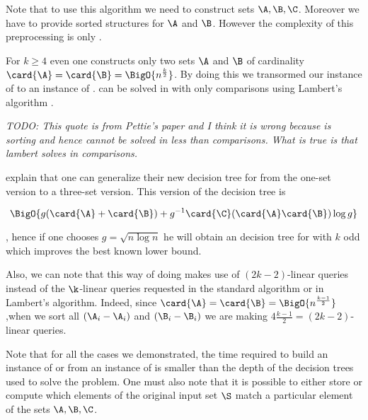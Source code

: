 Note that to use this algorithm we need to construct sets \(\A,\B,\C\).
Moreover we have to provide sorted structures for \(\A\) and \(\B\). However
the complexity of this preprocessing is only .

For \(k \ge 4\) even one constructs only two sets \(\A\) and \(\B\) of
cardinality \(\card{\A} = \card{\B} = \BigO{n^{\frac{k}{2}}}\). By doing this
we transormed our instance of \kLDT to an instance of \twoSUM. \twoSUM can be
solved in  with only 
comparisons using Lambert's algorithm \cite{lambert:1990}.

\emph{TODO: This quote is from Pettie's paper and I think it is wrong because
\twoSUM is sorting and hence cannot be solved in less than 
comparisons. What is true is that lambert solves \fourSUM in 
comparisons.}

\citet*{gronlund:2014} explain that one can generalize their new decision tree
for \threeSUM from the one-set version to a three-set version. This version of
the decision tree is

\begin{displaymath}
\BigO{g(\card{\A}+\card{\B}) + g^{-1}\card{\C}(\card{\A}\card{\B})\log g}
\end{displaymath}

, hence if one chooses \(g = \sqrt{n \log n}\) he will obtain an
 decision tree for \kLDT with $k$ odd
which improves the best known lower bound.

Also, we can note that this way of doing makes use of \((2k-2)\)-linear queries
instead of the \(\k\)-linear queries requested in the standard \threeSUM
algorithm or in Lambert's algorithm. Indeed, since \(\card{\A} = \card{\B} =
\BigO{n^{\frac{k-1}{2}}}\) ,when we sort all \((\A_i - \A_i)\) and \((\B_i -
\B_i)\) we are making \(4 \frac{k-1}{2} = (2k-2)\)-linear queries.

Note that for all the cases we demonstrated, the time required to build an
instance of \twoSUM or \threeSUM from an instance of \kLDT is smaller than the
depth of the decision trees used to solve the problem. One must also note that
it is possible to either store or compute which elements of the original input
set \(\S\) match a particular element of the sets \(\A,\B,\C\).
